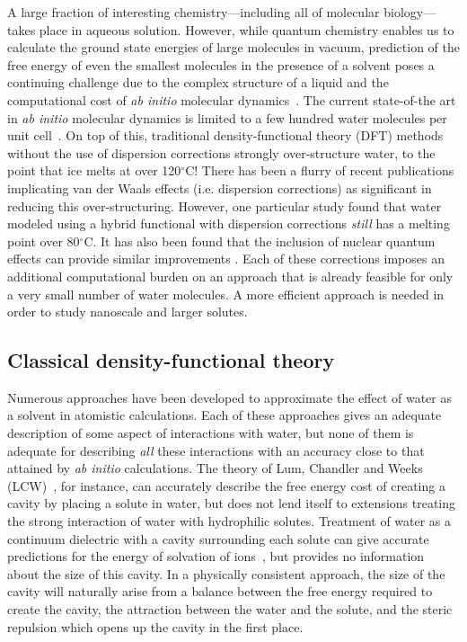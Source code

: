 \documentclass[twocolumn,amsmath,amssymb,prl]{revtex4-1}
\begin{document}
A large fraction of interesting chemistry---including all of molecular
biology---takes place in aqueous solution.  However, while quantum
chemistry enables us to calculate the ground state energies of large
molecules in vacuum, prediction of the free energy of even the
smallest molecules in the presence of a solvent poses a continuing
challenge due to the complex structure of a liquid and the
computational cost of \emph{ab initio} molecular
dynamics~\cite{car1985, grossman2004}.  The current state-of-the art
in \emph{ab initio} molecular dynamics is limited to a few hundred
water molecules per unit cell~\cite{lewis2011doesnitric}.
%
On top of this, traditional density-functional theory (DFT) methods
without the use of dispersion corrections strongly over-structure
water, to the point that ice melts at over 120$^\circ$C\cite{yoo2009phase}!
%
There has been a flurry of recent
publications implicating van der Waals effects (i.e. dispersion
corrections) as significant in
reducing this over-structuring\cite{lin2009importance,
  wang2011density, mogelhoj2011ab, jonchiere2011van}.
%
However, one particular study found that water modeled using a
hybrid functional with dispersion corrections \emph{still} has a
melting point over 80$^\circ$C\cite{yoo2011}.
%
It has also
been found that the inclusion of nuclear quantum effects can provide
similar improvements \cite{morrone2008nuclear}.  Each of these
corrections imposes an additional computational burden on an approach
that is already feasible for only a very small number of water
molecules. A more efficient approach is needed in order to study
nanoscale and larger solutes.

\subsection{Classical density-functional theory}

Numerous approaches have been developed to approximate the effect of water
as a solvent in atomistic calculations.  Each of these approaches gives an
adequate description of some aspect of interactions with water, but none of
them is adequate for describing \emph{all} these interactions with an
accuracy close to that attained by \emph{ab initio} calculations.  The
theory of Lum, Chandler and Weeks (LCW)~\cite{lum1999hydrophobicity}, for 
instance, can
accurately describe the free energy cost of creating a cavity by placing a
solute in water, but does not lend itself to extensions treating the strong
interaction of water with hydrophilic solutes.  Treatment of water as a
continuum dielectric with a cavity surrounding each solute can give
accurate predictions for the energy of solvation of ions~\cite{latimer1939,
rashin1985, zhan1998, hsu1999, hildebrandt2004, hildebrandt2007}, but
provides no information about the size of this cavity.  In a physically
consistent approach, the size of the cavity will naturally arise from a
balance between the free energy required to create the cavity, the
attraction between the water and the solute, and the steric repulsion which
opens up the cavity in the first place.
\end{document}
